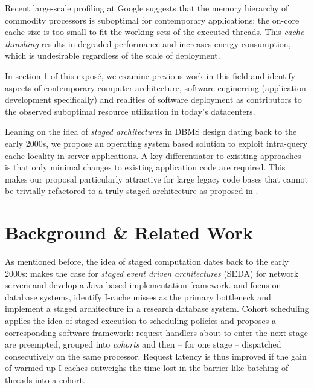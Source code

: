 \documentclass{article}
\begin{document}
Recent large-scale profiling at Google \cite{kanev2015profiling} suggests that the memory hierarchy of commodity
processors is suboptimal for contemporary applications:
the on-core cache size is too small to fit the working sets of the executed threads.
This \textit{cache thrashing} results in degraded performance and increases energy consumption, which is undesirable
regardless of the scale of deployment.

In section \ref{relatedwork} of this exposé, we examine previous work in this field and
identify aspects of contemporary computer architecture, software enginerring (application development specifically)
and realities of software deployment as contributors to the observed suboptimal resource utilization in today's datacenters.

Leaning on the idea of \emph{staged architectures} in DBMS design \cite{seda} dating back to the early 2000s,
we propose an operating system based solution to exploit intra-query cache locality in server applications.
A key differentiator to exisiting approaches is that only minimal changes to existing application code are required.
This makes our proposal particularly attractive for large legacy code bases that cannot be trivially refactored to a
truly staged architecture as proposed in \cite{seda}.

\section{Background \& Related Work}\label{relatedwork}

As mentioned before, the idea of staged computation dates back to the early 2000s:
\cite{seda} makes the case for \textit{staged event driven architectures} (SEDA) for network servers and
develop a Java-based implementation framework.
\cite{harizopoulos2003case} and \cite{harizopoulos2005staged} focus on database systems, identify I-cache
misses as the primary bottleneck and implement a staged architecture in a research database system.
Cohort scheduling \cite{cohort} applies the idea of staged execution to scheduling policies and proposes
a corresponding software framework: request handlers about to enter the next stage are preempted, grouped into
\textit{cohorts} and then -- for one stage -- dispatched consecutively on the same processor.
Request latency is thus improved if the gain of warmed-up I-caches outweighs the time lost in the barrier-like batching
of threads into a cohort.
\end{document}
